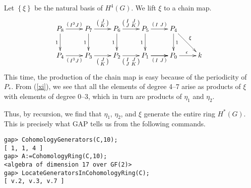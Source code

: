 \documentclass[12pt]{article}
\begin{document}
Let $\left\{\xi\right\}$ be the natural 
basis of $H^4\left(G\right)$.
We lift $\xi$ to a chain map.
\begin{equation}\label{xi}
\begin{xy}\xymatrix{
P_8\ar[r]^{\left(\begin{smallmatrix}I^3J\end{smallmatrix}\right)}
\ar[d]_1
&P_7\ar[r]^{\left(\begin{smallmatrix}J\\K\end{smallmatrix}\right)}
\ar[d]_1
&P_6\ar[r]^{\left(\begin{smallmatrix}I&J\\J&K\end{smallmatrix}\right)}
\ar[d]_1
&P_5\ar[r]^{\left(\begin{smallmatrix}I&J\end{smallmatrix}\right)}
\ar[d]_1
&P_4\ar[rd]^{\xi}\ar[d]^1\\
P_4\ar[r]_{\left(\begin{smallmatrix}I^3J\end{smallmatrix}\right)}
&P_3\ar[r]_{\left(\begin{smallmatrix}J\\K\end{smallmatrix}\right)}
&P_2\ar[r]_{\left(\begin{smallmatrix}I&J\\J&K\end{smallmatrix}\right)}
&P_1\ar[r]_{\left(\begin{smallmatrix}I&J\end{smallmatrix}\right)}\ar[r]
&P_0\ar[r]^\epsilon
&k
}\end{xy}
\end{equation}
This time, the production of the chain map is easy because
of the periodicity of $P_\ast$. 
From (\ref{xi}), we see that all the elements of degree 4--7 
arise as products of $\xi$ with elements of degree
0--3, which in turn are products of $\eta_1$ and $\eta_2$.

Thus, by recursion, we find that 
$\eta_1$, $\eta_2$, and $\xi$ generate the entire ring
$H^\ast\left(G\right)$.
This is precisely what \textsf{GAP} tells us from
the following commands.
\begin{verbatim}
gap> CohomologyGenerators(C,10);
[ 1, 1, 4 ]
gap> A:=CohomologyRing(C,10);
<algebra of dimension 17 over GF(2)>
gap> LocateGeneratorsInCohomologyRing(C);
[ v.2, v.3, v.7 ]
\end{verbatim}
\end{document}
